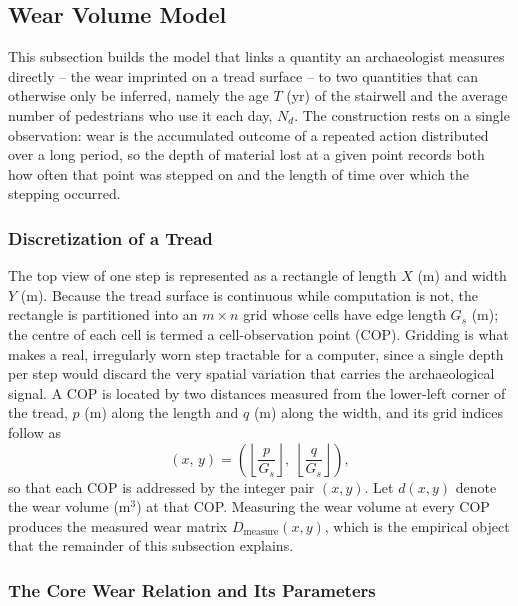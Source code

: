 \subsection{Wear Volume Model}
\label{subsec:wear-volume-model}

This subsection builds the model that links a quantity an archaeologist measures directly -- the wear imprinted on a tread surface -- to two quantities that can otherwise only be inferred, namely the age $T$ (yr) of the stairwell and the average number of pedestrians who use it each day, $N_d$. The construction rests on a single observation: wear is the accumulated outcome of a repeated action distributed over a long period, so the depth of material lost at a given point records both how often that point was stepped on and the length of time over which the stepping occurred.

\subsubsection{Discretization of a Tread}
\label{subsubsec:discretization}

The top view of one step is represented as a rectangle of length $X$ (m) and width $Y$ (m). Because the tread surface is continuous while computation is not, the rectangle is partitioned into an $m \times n$ grid whose cells have edge length $G_s$ (m); the centre of each cell is termed a cell-observation point (COP). Gridding is what makes a real, irregularly worn step tractable for a computer, since a single depth per step would discard the very spatial variation that carries the archaeological signal. A COP is located by two distances measured from the lower-left corner of the tread, $p$ (m) along the length and $q$ (m) along the width, and its grid indices follow as
\begin{equation}
(x,\,y) = \left(\left\lfloor \frac{p}{G_s}\right\rfloor,\; \left\lfloor \frac{q}{G_s}\right\rfloor\right),
\label{eq:cop-index}
\end{equation}
so that each COP is addressed by the integer pair $(x,y)$. Let $d(x,y)$ denote the wear volume (m$^3$) at that COP. Measuring the wear volume at every COP produces the measured wear matrix $D_{\text{measure}}(x,y)$, which is the empirical object that the remainder of this subsection explains.

\subsubsection{The Core Wear Relation and Its Parameters}
\label{subsubsec:core-and-parameters}

